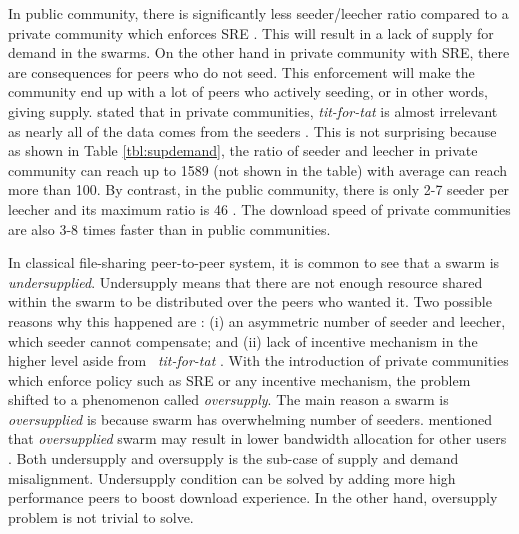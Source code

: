 In public community, there is significantly less seeder/leecher ratio compared to a private community which enforces SRE \cite{2010:pubpriv:meulpolder,2009:demandsupplyres:andrade}. This will result in a lack of supply for demand in the swarms. On the other hand in private community with SRE, there are consequences for peers who do not seed. This enforcement will make the community end up with a lot of peers who actively seeding, or in other words, giving supply. \citeauthor{2010:pubpriv:meulpolder} stated that in private communities, \textit{tit-for-tat} is almost irrelevant as nearly all of the data comes from the seeders \cite{2010:pubpriv:meulpolder}. This is not surprising because as shown in Table \ref{tbl:supdemand}, the ratio of seeder and leecher in private community can reach up to 1589 (not shown in the table) with average can reach more than 100. By contrast, in the public community, there is only 2-7 seeder per leecher and its maximum ratio is 46 \cite{2010:pubpriv:meulpolder}. The download speed of private communities are also 3-8 times faster than in public communities. 

In classical file-sharing peer-to-peer system, it is common to see that a swarm is \textit{undersupplied}. Undersupply means that there are not enough resource shared within the swarm to be distributed over the peers who wanted it. Two possible reasons why this happened are : (i) an asymmetric number of seeder and leecher, which seeder cannot compensate; and (ii) lack of incentive mechanism in the higher level aside from \bt~\textit{tit-for-tat} \cite{2009:demandsupplyres:andrade}. With the introduction of private communities which enforce policy such as SRE or any incentive mechanism, the problem shifted to a phenomenon called \textit{oversupply}. The main reason a swarm is \textit{oversupplied} is because swarm has overwhelming number of seeders. \citeauthor{2013:survivepriv:jia} mentioned that \textit{oversupplied} swarm may result in lower bandwidth allocation for other users \cite{2013:survivepriv:jia}. Both undersupply and oversupply is the sub-case of supply and demand misalignment. Undersupply condition can be solved by adding more high performance peers to boost download experience. In the other hand, oversupply problem is not trivial to solve.

